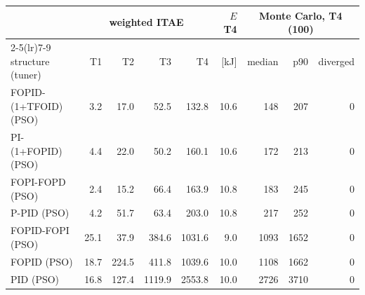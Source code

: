 \begin{tabular}{lrrrrrrrr}
\toprule
 & \multicolumn{4}{c}{weighted ITAE} & $E$ T4 & \multicolumn{3}{c}{Monte Carlo, T4 (100)} \\ \cmidrule(lr){2-5}\cmidrule(lr){7-9}
structure (tuner) & T1 & T2 & T3 & T4 & [kJ] & median & p90 & diverged \\
\midrule
FOPID-(1+TFOID) (PSO) & 3.2 & 17.0 & 52.5 & 132.8 & 10.6 & 148 & 207 & 0 \\
PI-(1+FOPID) (PSO) & 4.4 & 22.0 & 50.2 & 160.1 & 10.6 & 172 & 213 & 0 \\
FOPI-FOPD (PSO) & 2.4 & 15.2 & 66.4 & 163.9 & 10.8 & 183 & 245 & 0 \\
P-PID (PSO) & 4.2 & 51.7 & 63.4 & 203.0 & 10.8 & 217 & 252 & 0 \\
FOPID-FOPI (PSO) & 25.1 & 37.9 & 384.6 & 1031.6 & 9.0 & 1093 & 1652 & 0 \\
FOPID (PSO) & 18.7 & 224.5 & 411.8 & 1039.6 & 10.0 & 1108 & 1662 & 0 \\
PID (PSO) & 16.8 & 127.4 & 1119.9 & 2553.8 & 10.0 & 2726 & 3710 & 0 \\
\bottomrule
\end{tabular}
